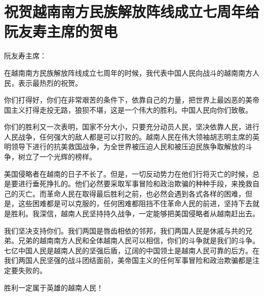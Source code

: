 \section[祝贺越南南方民族解放阵线成立七周年给阮友寿主席的贺电（一九六七年十二月十九日）]{祝贺越南南方民族解放阵线成立七周年给阮友寿主席的贺电}


\noindent 阮友寿主席：

在越南南方民族解放阵线成立七周年的时候，我代表中国人民向战斗的越南南方人民，表示最热烈的祝贺。

你们打得好，你们在非常艰苦的条件下，依靠自己的力量，把世界上最凶恶的美帝国主义打得走投无路，狼狈不堪，这是一个伟大的胜利。中国人民向你们致敬。

你们的胜利又一次表明，国家不分大小，只要充分动员人民，坚决依靠人民，进行人民战争，任何强大的敌人都是可以打败的。越南人民在伟大领袖胡志明主席的英明领导下进行的抗美救国战争，为全世界被压迫人民和被压迫民族争取解放的斗争，树立了一个光辉的榜样。

美国侵略者在越南的日子不长了。但是，一切反动势力在他们行将灭亡的时候，总是要进行垂死挣扎的。他们必然要采取军事冒险和政治欺骗的种种手段，来挽救自己的灭亡。而革命人民在取得最后胜利之前，也必然会遇到各式各样的困难，但是，这些困难都是可以克服的，任何困难都阻挡不住革命人民的前进，坚持下去就是胜利。我深信，越南人民坚持持久战争，一定能够把美国侵略者从越南赶出去。

我们坚决支持你们。我们两国是唇齿相依的邻邦，我们两国人民是休戚与共的兄弟。兄弟的越南南方人民和全体越南人民可以相信，你们的斗争就是我们的斗争。七亿中国人民是越南人民的坚强后盾，辽阔的中国领土是越南人民可靠的后方。在我们两国人民坚强的战斗团结面前，美帝国主义的任何军事冒险和政治欺骗都是注定要失败的。

胜利一定属于英雄的越南人民！



